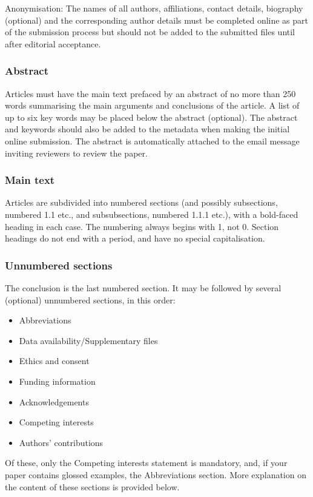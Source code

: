 \documentclass[charis,linguex]{glossa}
\begin{document}
Anonymisation: The names of all authors, affiliations, contact details, biography (optional) and the corresponding author details must be completed online as part of the submission process but should not be added to the submitted files until after editorial acceptance.

\subsubsection{Abstract}

Articles must have the main text prefaced by an abstract of no more than 250 words summarising the main arguments and conclusions of the article. A list of up to six key words may be placed below the abstract (optional). The abstract and keywords should also be added to the metadata when making the initial online submission. The abstract is automatically attached to the email message inviting reviewers to review the paper.

\subsubsection{Main text}

Articles are subdivided into numbered sections (and possibly subsections, numbered 1.1 etc., and subsubsections, numbered 1.1.1 etc.), with a bold-faced heading in each case. The numbering always begins with 1, not 0. Section headings do not end with a period, and have no special capitalisation.

\subsubsection{Unnumbered sections}
The conclusion is the last numbered section. It may be followed by several (optional) unnumbered sections, in this order: 
\begin{itemize}
\item Abbreviations
\item Data availability/Supplementary files
\item Ethics and consent
\item Funding information
\item Acknowledgements
\item Competing interests
\item Authors' contributions
\end{itemize}

\noindent Of these, only the Competing interests statement is mandatory, and, if your paper contains glossed examples, the Abbreviations section. More explanation on the content of these sections is provided below.
\end{document}
